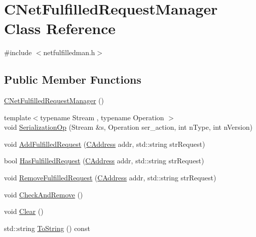 \hypertarget{class_c_net_fulfilled_request_manager}{}\section{C\+Net\+Fulfilled\+Request\+Manager Class Reference}
\label{class_c_net_fulfilled_request_manager}


{\ttfamily \#include $<$netfulfilledman.\+h$>$}

\subsection*{Public Member Functions}
\begin{DoxyCompactItemize}
\item 
\mbox{\hyperlink{class_c_net_fulfilled_request_manager_a74df64fc0168917f6b4189180174494d}{C\+Net\+Fulfilled\+Request\+Manager}} ()
\item 
{\footnotesize template$<$typename Stream , typename Operation $>$ }\\void \mbox{\hyperlink{class_c_net_fulfilled_request_manager_a09fcf2b2201fa14e4ffa202847850122}{Serialization\+Op}} (Stream \&s, Operation ser\+\_\+action, int n\+Type, int n\+Version)
\item 
void \mbox{\hyperlink{class_c_net_fulfilled_request_manager_a5dfcf200b5837fef5bb83b51c58bba61}{Add\+Fulfilled\+Request}} (\mbox{\hyperlink{class_c_address}{C\+Address}} addr, std\+::string str\+Request)
\item 
bool \mbox{\hyperlink{class_c_net_fulfilled_request_manager_a1e4b7cdeb0f4fae6113c6714cf3b54bf}{Has\+Fulfilled\+Request}} (\mbox{\hyperlink{class_c_address}{C\+Address}} addr, std\+::string str\+Request)
\item 
void \mbox{\hyperlink{class_c_net_fulfilled_request_manager_a3f4fdff1f1d5df96c13769d5e4bd9fe1}{Remove\+Fulfilled\+Request}} (\mbox{\hyperlink{class_c_address}{C\+Address}} addr, std\+::string str\+Request)
\item 
void \mbox{\hyperlink{class_c_net_fulfilled_request_manager_a2fe3a1dbb8b0361213c7c45c91e1156f}{Check\+And\+Remove}} ()
\item 
void \mbox{\hyperlink{class_c_net_fulfilled_request_manager_aa44f731ac39618bf8748e552203ba59f}{Clear}} ()
\item 
std\+::string \mbox{\hyperlink{class_c_net_fulfilled_request_manager_a7d0459ba78d3e51701f16efa23ac50c4}{To\+String}} () const
\end{DoxyCompactItemize}
